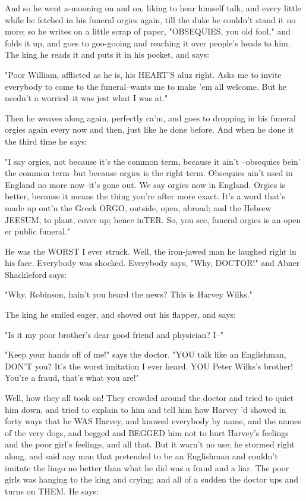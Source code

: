 And so he went a-mooning on and on, liking to hear himself talk, and
every little while he fetched in his funeral orgies again, till the duke
he couldn't stand it no more; so he writes on a little scrap of paper,
"OBSEQUIES, you old fool," and folds it up, and goes to goo-gooing and
reaching it over people's heads to him.  The king he reads it and puts it
in his pocket, and says:

"Poor William, afflicted as he is, his HEART'S aluz right.  Asks me to
invite everybody to come to the funeral--wants me to make 'em all
welcome.  But he needn't a worried--it was jest what I was at."

Then he weaves along again, perfectly ca'm, and goes to dropping in his
funeral orgies again every now and then, just like he done before.  And
when he done it the third time he says:

"I say orgies, not because it's the common term, because it ain't
--obsequies bein' the common term--but because orgies is the right term.
Obsequies ain't used in England no more now--it's gone out.  We say
orgies now in England.  Orgies is better, because it means the thing
you're after more exact.  It's a word that's made up out'n the Greek
ORGO, outside, open, abroad; and the Hebrew JEESUM, to plant, cover up;
hence inTER.  So, you see, funeral orgies is an open er public funeral."

He was the WORST I ever struck.  Well, the iron-jawed man he laughed
right in his face.  Everybody was shocked.  Everybody says, "Why,
DOCTOR!" and Abner Shackleford says:

"Why, Robinson, hain't you heard the news?  This is Harvey Wilks."

The king he smiled eager, and shoved out his flapper, and says:

"Is it my poor brother's dear good friend and physician?  I--"

"Keep your hands off of me!" says the doctor.  "YOU talk like an
Englishman, DON'T you?  It's the worst imitation I ever heard.  YOU Peter
Wilks's brother!  You're a fraud, that's what you are!"

Well, how they all took on!  They crowded around the doctor and tried to
quiet him down, and tried to explain to him and tell him how Harvey 'd
showed in forty ways that he WAS Harvey, and knowed everybody by name,
and the names of the very dogs, and begged and BEGGED him not to hurt
Harvey's feelings and the poor girl's feelings, and all that.  But it
warn't no use; he stormed right along, and said any man that pretended to
be an Englishman and couldn't imitate the lingo no better than what he
did was a fraud and a liar.  The poor girls was hanging to the king and
crying; and all of a sudden the doctor ups and turns on THEM.  He says:

